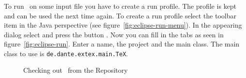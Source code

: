 To run \ExTeX\ on some input file you have to create a run profile.
The profile is kept and can be used the next time again. To create a
run profile select the toolbar item  in the Java
perspective (see figure~\ref{fig:eclipse-run-menu}). In the appearing
dialog select  and press the button .
Now you can fill in the tabs as seen in figure~\ref{fig:eclipse-run}.
Enter a name, the project and the main class. The main class to use is
\texttt{de.dante.extex.main.TeX}.
\begin{figure}[htp]
  \hbox{}\hfill
  \hfill
  \caption{Checking out \ExTeX\ from the Repository}
\end{figure}

